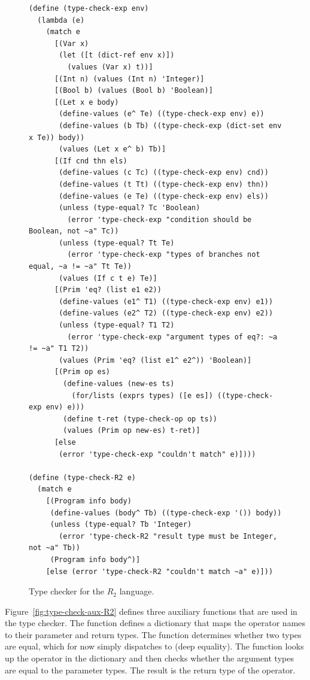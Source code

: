 \documentclass[11pt]{book}
\begin{document}
\begin{figure}[tbp]
\begin{lstlisting}[basicstyle=\ttfamily\footnotesize]
(define (type-check-exp env)
  (lambda (e)
    (match e
      [(Var x)
       (let ([t (dict-ref env x)])
         (values (Var x) t))]
      [(Int n) (values (Int n) 'Integer)]
      [(Bool b) (values (Bool b) 'Boolean)]
      [(Let x e body)
       (define-values (e^ Te) ((type-check-exp env) e))
       (define-values (b Tb) ((type-check-exp (dict-set env x Te)) body))
       (values (Let x e^ b) Tb)]
      [(If cnd thn els)
       (define-values (c Tc) ((type-check-exp env) cnd))
       (define-values (t Tt) ((type-check-exp env) thn))
       (define-values (e Te) ((type-check-exp env) els))
       (unless (type-equal? Tc 'Boolean)
         (error 'type-check-exp "condition should be Boolean, not ~a" Tc))
       (unless (type-equal? Tt Te)
         (error 'type-check-exp "types of branches not equal, ~a != ~a" Tt Te))
       (values (If c t e) Te)]
      [(Prim 'eq? (list e1 e2))
       (define-values (e1^ T1) ((type-check-exp env) e1))
       (define-values (e2^ T2) ((type-check-exp env) e2))
       (unless (type-equal? T1 T2)
         (error 'type-check-exp "argument types of eq?: ~a != ~a" T1 T2))
       (values (Prim 'eq? (list e1^ e2^)) 'Boolean)]
      [(Prim op es)
        (define-values (new-es ts)
          (for/lists (exprs types) ([e es]) ((type-check-exp env) e)))
        (define t-ret (type-check-op op ts))
        (values (Prim op new-es) t-ret)]
      [else
       (error 'type-check-exp "couldn't match" e)])))

(define (type-check-R2 e)
  (match e
    [(Program info body)
     (define-values (body^ Tb) ((type-check-exp '()) body))
     (unless (type-equal? Tb 'Integer)
       (error 'type-check-R2 "result type must be Integer, not ~a" Tb))
     (Program info body^)]
    [else (error 'type-check-R2 "couldn't match ~a" e)]))
\end{lstlisting}
\caption{Type checker for the $R_2$ language.}
\label{fig:type-check-R2}
\end{figure}


Figure~\ref{fig:type-check-aux-R2} defines three auxiliary functions
that are used in the type checker. The  function
defines a dictionary that maps the operator names to their parameter
and return types. The  function determines whether
two types are equal, which for now simply dispatches to 
(deep equality). The  function looks up the
operator in the  dictionary and then checks
whether the argument types are equal to the parameter types.  The
result is the return type of the operator.
\end{document}
